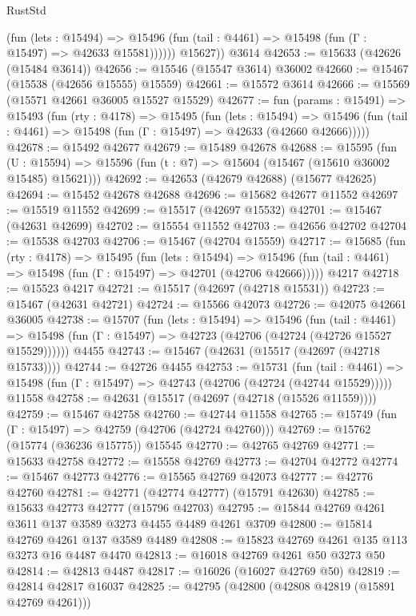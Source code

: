\begin{lexlean}{RustStd}
\begin{coremodule}
              (fun (lets : @15494) =>
              @15496 (fun (tail : @4461) => @15498 (fun (Γ : @15497) => @42633 @15581))))))
        @15627))
    @3614
@42653 := @15633 (@42626 (@15484 @3614))
@42656 := @15546 (@15547 @3614) @36002
@42660 := @15467 (@15538 (@42656 @15555) @15559)
@42661 := @15572 @3614
@42666 := @15569 (@15571 @42661 @36005 @15527 @15529)
@42677 := fun (params : @15491) =>
  @15493
    (fun (rty : @4178) =>
    @15495
      (fun (lets : @15494) =>
      @15496 (fun (tail : @4461) => @15498 (fun (Γ : @15497) => @42633 (@42660 @42666)))))
@42678 := @15492 @42677
@42679 := @15489 @42678
@42688 := @15595
    (fun (U : @15594) => @15596 (fun (t : @7) => @15604 (@15467 (@15610 @36002 @15485) @15621)))
@42692 := @42653 (@42679 @42688) (@15677 @42625)
@42694 := @15452 @42678 @42688
@42696 := @15682 @42677 @11552
@42697 := @15519 @11552
@42699 := @15517 (@42697 @15532)
@42701 := @15467 (@42631 @42699)
@42702 := @15554 @11552
@42703 := @42656 @42702
@42704 := @15538 @42703
@42706 := @15467 (@42704 @15559)
@42717 := @15685
    (fun (rty : @4178) =>
    @15495
      (fun (lets : @15494) =>
      @15496 (fun (tail : @4461) => @15498 (fun (Γ : @15497) => @42701 (@42706 @42666)))))
    @4217
@42718 := @15523 @4217
@42721 := @15517 (@42697 (@42718 @15531))
@42723 := @15467 (@42631 @42721)
@42724 := @15566 @42073
@42726 := @42075 @42661 @36005
@42738 := @15707
    (fun (lets : @15494) =>
    @15496
      (fun (tail : @4461) =>
      @15498 (fun (Γ : @15497) => @42723 (@42706 (@42724 (@42726 @15527 @15529))))))
    @4455
@42743 := @15467 (@42631 (@15517 (@42697 (@42718 @15733))))
@42744 := @42726 @4455
@42753 := @15731
    (fun (tail : @4461) => @15498 (fun (Γ : @15497) => @42743 (@42706 (@42724 (@42744 @15529)))))
    @11558
@42758 := @42631 (@15517 (@42697 (@42718 (@15526 @11559))))
@42759 := @15467 @42758
@42760 := @42744 @11558
@42765 := @15749 (fun (Γ : @15497) => @42759 (@42706 (@42724 @42760)))
@42769 := @15762 (@15774 (@36236 @15775)) @15545
@42770 := @42765 @42769
@42771 := @15633 @42758
@42772 := @15558 @42769
@42773 := @42704 @42772
@42774 := @15467 @42773
@42776 := @15565 @42769 @42073
@42777 := @42776 @42760
@42781 := @42771 (@42774 @42777) (@15791 @42630)
@42785 := @15633 @42773 @42777 (@15796 @42703)
@42795 := @15844 @42769 @4261 @3611 @137 @3589 @3273 @4455 @4489 @4261 @3709
@42800 := @15814 @42769 @4261 @137 @3589 @4489
@42808 := @15823 @42769 @4261 @135 @113 @3273 @16 @4487 @4470
@42813 := @16018 @42769 @4261 @50 @3273 @50
@42814 := @42813 @4487
@42817 := @16026 (@16027 @42769 @50)
@42819 := @42814 @42817 @16037
@42825 := @42795 (@42800 (@42808 @42819 (@15891 @42769 @4261)))

\end{coremodule}
\end{lexlean}
